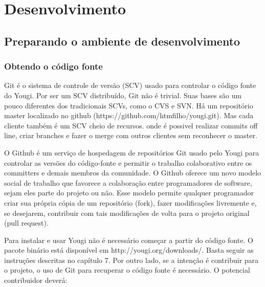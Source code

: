 \documentclass[envcountsame,envcountchap]{svmono}
\begin{document}
\chapter{Desenvolvimento}

\section{Preparando o ambiente de desenvolvimento}

\subsection{Obtendo o código fonte}
\label{ssec:obtaining-source-code}

Git é o sistema de controle de versão (SCV) usado para controlar o código fonte do Yougi. Por ser um SCV distribuído, Git não é trivial. Suas bases são um pouco diferentes dos tradicionais SCVs, como o CVS e SVN. Há um repositório master localizado no github (https://github.com/htmfilho/yougi.git). Mas cada cliente também é um SCV cheio de recursos. onde é possivel realizar commits off line, criar branches e fazer o merge com outros clientes sem reconhecer o master.

O Github é um serviço de hospedagem de repositórios Git usado pelo Yougi para controlar as versões do código-fonte e permitir o trabalho colaborativo entre os committers e demais membros da comunidade. O Github oferece um novo modelo social de trabalho que favorece a colaboração entre programadores de software, sejam eles parte do projeto ou não. Esse modelo permite qualquer programador criar sua própria cópia de um repositório (fork), fazer modificações livremente e, se desejarem, contribuir com tais modificações de volta para o projeto original (pull request).

Para instalar e usar Yougi não é necessário começar a partir do código fonte. O pacote binário está disponível em http://yougi.org/downloads/. Basta seguir as instruções descritas no capítulo 7. Por outro lado, se a intenção é contribuir para o projeto, o uso de Git para recuperar o código fonte é necessário. O potencial contribuidor deverá:
\end{document}
